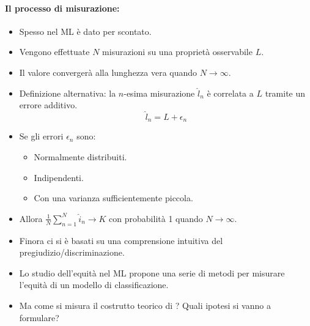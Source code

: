 \paragraph{Il processo di misurazione:}

\begin{itemize}
  \item Spesso nel ML è dato per scontato. 
  \item Vengono effettuate $N$ misurazioni su una proprietà osservabile $L$. 
  \item Il valore convergerà alla lunghezza vera quando $N \rightarrow \infty$. 
  \item Definizione alternativa: la $n$-esima misurazione $\hat l_n$ è correlata a $L$ tramite un errore additivo. 
    $$\hat l_n = L + \epsilon_n$$
  \item Se gli errori $\epsilon_n$ sono: 
    \begin{itemize}
      \item Normalmente distribuiti. 
      \item Indipendenti. 
      \item Con una varianza sufficientemente piccola. 
    \end{itemize}
  \item Allora $\frac{1}{N} \sum_{n=1}^N \hat i_n \rightarrow K$ con probabilità 1 quando $N \rightarrow \infty$.
\end{itemize}




\begin{itemize}
  \item Finora ci si è basati su una comprensione intuitiva del pregiudizio/discriminazione. 
  \item Lo studio dell'equità nel ML propone una serie di metodi per misurare l'equità di un modello di classificazione. 
  \item Ma come si misura il costrutto teorico di ? Quali ipotesi si vanno a formulare?
\end{itemize}

